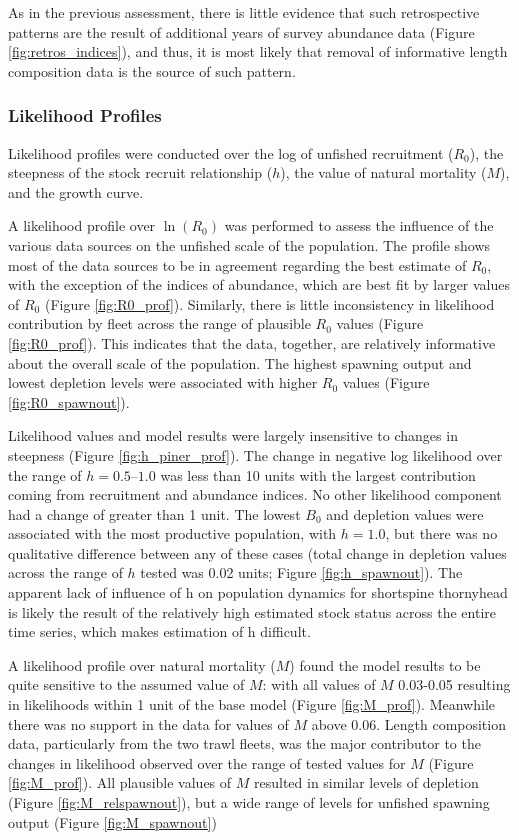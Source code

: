 \documentclass[11pt,
  english,
  letterpaper,
]{article}
\begin{document}
As in the previous assessment, there is little evidence that such retrospective patterns are the result of additional years of survey abundance data (Figure \ref{fig:retros_indices}), and thus, it is most likely that removal of informative length composition data is the source of such pattern.

\hypertarget{likelihood-profiles}{%
\subsubsection{Likelihood Profiles}\label{likelihood-profiles}}

Likelihood profiles were conducted over the log of unfished recruitment (\(R_0\)), the steepness of the stock recruit relationship (\(h\)), the value of natural mortality (\(M\)), and the growth curve.

A likelihood profile over \(\ln(R_0)\) was performed to assess the influence of the various data sources on the unfished scale of the population. The profile shows most of the data sources to be in agreement regarding the best estimate of \(R_0\), with the exception of the indices of abundance, which are best fit by larger values of \(R_0\) (Figure \ref{fig:R0_prof}). Similarly, there is little inconsistency in likelihood contribution by fleet across the range of plausible \(R_0\) values (Figure \ref{fig:R0_prof}). This indicates that the data, together, are relatively informative about the overall scale of the population. The highest spawning output and lowest depletion levels were associated with higher \(R_0\) values (Figure \ref{fig:R0_spawnout}).

Likelihood values and model results were largely insensitive to changes in steepness (Figure \ref{fig:h_piner_prof}). The change in negative log likelihood over the range of \(h = 0.5–1.0\) was less than 10 units with the largest contribution coming from recruitment and abundance indices. No other likelihood component had a change of greater than 1 unit. The lowest \(B_0\) and depletion values were associated with the most productive population, with \(h = 1.0\), but there was no qualitative difference between any of these cases (total change in depletion values across the range of \(h\) tested was 0.02 units; Figure \ref{fig:h_spawnout}). The apparent lack of influence of h on population dynamics for shortspine thornyhead is likely the result of the relatively high estimated stock status across the entire time series, which makes estimation of h difficult.

A likelihood profile over natural mortality (\(M\)) found the model results to be quite sensitive to the assumed value of \(M\): with all values of \(M\) 0.03-0.05 resulting in likelihoods within 1 unit of the base model (Figure \ref{fig:M_prof}). Meanwhile there was no support in the data for values of \(M\) above 0.06. Length composition data, particularly from the two trawl fleets, was the major contributor to the changes in likelihood observed over the range of tested values for \(M\) (Figure \ref{fig:M_prof}). All plausible values of \(M\) resulted in similar levels of depletion (Figure \ref{fig:M_relspawnout}), but a wide range of levels for unfished spawning output (Figure \ref{fig:M_spawnout})
\end{document}
